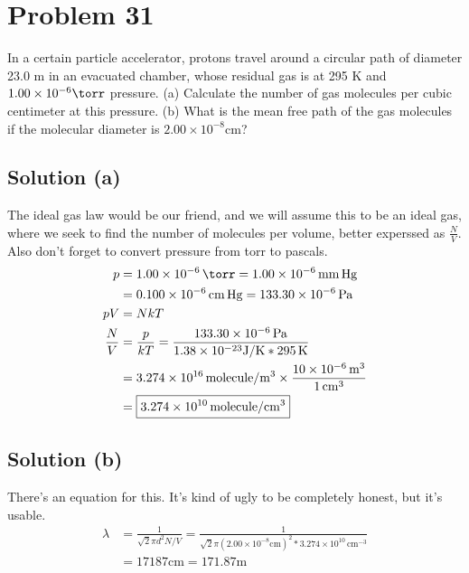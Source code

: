 \documentclass[12pt]{article}
\newcommand{\E}[1]{\times 10^{#1}}
\begin{document}
    \pagebreak
    \section{Problem 31}
        In a certain particle accelerator, protons travel around a circular path of diameter 23.0 m in an evacuated chamber, whose residual gas is at 295 K and $1.00 \times 10^{-6} \unit{\torr}$ pressure. 
        (a) Calculate the number of gas molecules per cubic centimeter at this pressure.
        (b) What is the mean free path of the gas molecules if the molecular diameter is $2.00 \times 10^{-8} \unit{\centi\meter}$?

        \subsection{Solution (a)}
            The ideal gas law would be our friend, and we will assume this to be an ideal gas, where we seek to find the number of molecules per volume, better experssed as $\frac{N}{V}$.
            Also don't forget to convert pressure from torr to pascals.
            \begin{align}
                p   &=  1.00\E{-6}\,\unit{\torr}
                    =   1.00\E{-6}\,\unit{\milli\meter}\,{\rm Hg}\\
                    &=  0.100\E{-6}\,\unit{\centi\meter}\,{\rm Hg}
                    =   133.30\E{-6}\,\unit{\pascal}\\
                pV  &=  NkT\\
                \frac{N}{V} &=  \frac{p}{kT}
                    =   \frac{133.30\E{-6}\,\unit{\pascal}}{1.38\E{-23}\unit{\joule/\kelvin} * 295\,\unit{\kelvin}}\\
                    &=  3.274\E{16}\,\unit{molecule/\meter^3} \times \frac{10\E{-6}\,\unit{\meter^3}}{1\,\unit{\centi\meter^3}}\\
                    &=  \boxed{3.274\E{10}\,\unit{molecule/\centi\meter^3}}
            \end{align}
        
        \subsection{Solution (b)}
            There's an equation for this.
            It's kind of ugly to be completely honest, but it's usable.
            \begin{align}
                \lambda &=  \frac{1}{\sqrt{2}\pi d^2 N/V}
                    =   \frac{1}{\sqrt{2}\pi (2.00 \times 10^{-8} \unit{\centi\meter})^2 * 3.274\E{10}\,\unit{\centi\meter^{-3}}}\\
                    &=  17187\unit{\centi\meter}
                    =   \boxed{171.87\unit{\meter}}
            \end{align}
\end{document}
